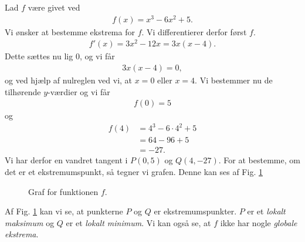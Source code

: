 \begin{exa}
	Lad $f$ være givet ved
	\begin{align*}
		f(x) = x^3-6x^2+5.
	\end{align*}
	Vi ønsker at bestemme ekstrema for $f$. Vi differentierer derfor først $f$.
	\begin{align*}
		f'(x) = 3x^2-12x = 3x(x-4).
	\end{align*}
	Dette sættes nu lig $0$, og vi får
	\begin{align*}
		3x(x-4) = 0, 
	\end{align*}
	og ved hjælp af nulreglen ved vi, at $x=0$ eller $x = 4$. Vi bestemmer nu de tilhørende $y$-værdier og vi får
	\begin{align*}
		f(0) = 5
	\end{align*}
	og 
	\begin{align*}
		f(4) &= 4^3 - 6\cdot 4^2+5\\
		&= 64-96+5\\
		&= -27.
	\end{align*}
	Vi har derfor en vandret tangent i $P(0,5)$ og $Q(4,-27)$. For at bestemme, om det er et ekstremumspunkt, så tegner vi grafen. Denne kan ses af Fig. \ref{fig:ekstrema}
	\begin{figure}[H]
		\centering
		\caption{Graf for funktionen $f$.}
		\label{fig:ekstrema}
	\end{figure}
\end{exa}
Af Fig. \ref{fig:ekstrema} kan vi se, at punkterne $P$ og $Q$ er ekstremumspunkter. $P$ er et \textit{lokalt maksimum} og $Q$ er et \textit{lokalt minimum}. Vi kan også se, at $f$ ikke har nogle 
\textit{globale ekstrema}.


